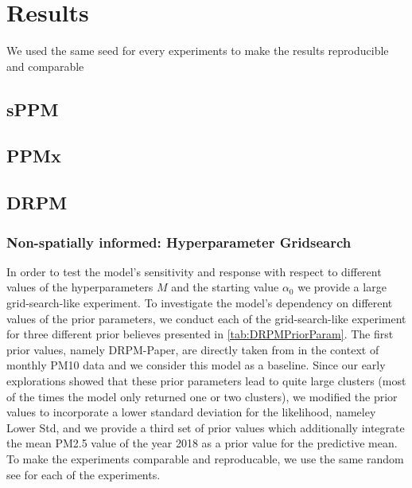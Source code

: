 \documentclass[12pt,a4paper]{article}
\begin{document}
\newpage

\section{Results}
We used the same seed for every experiments to make the results
reproducible and comparable
\subsection{sPPM}
\subsection{PPMx}
\subsection{DRPM}
\subsubsection{Non-spatially informed: Hyperparameter Gridsearch}
In order to test the model's sensitivity and response with respect to different values of the hyperparameters $M$ and the starting value
$\alpha_0$ we provide a large grid-search-like experiment. To investigate the model's dependency on different values of the prior parameters,
we conduct each of the grid-search-like experiment for three different prior believes presented in \cref{tab:DRPMPriorParam}. The first
prior values, namely DRPM-Paper, are directly taken from \cite[Section 4.1]{Page2021-Temporal} in the context of monthly PM10 data
and we consider this model as a baseline. Since our early explorations showed that these prior parameters lead to quite large clusters
(most of the times the model only returned one or two clusters), we modified the prior values to incorporate a lower standard deviation
for the likelihood, nameley Lower Std, and we provide a third set of prior values which additionally integrate the mean PM2.5 value
of the year 2018 as a prior value for the predictive mean. To make the experiments comparable and reproducable, we use the same
random see for each of the experiments.
\end{document}
